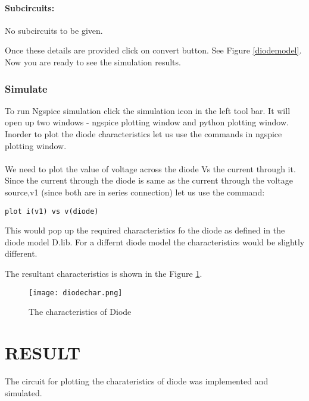 \paragraph{Subcircuits:} No subcircuits to be given.

\noindent Once these details are provided click on convert button. See Figure \ref{diodemodel}. Now you are ready to see the simulation results.

\subsubsection{Simulate} To run Ngspice simulation click the simulation icon in the left tool bar. It will open up two windows - ngspice plotting window and python plotting window. Inorder to plot the diode characteristics let us use the commands in ngspice plotting window. 

\paragraph{}We need to plot the value of voltage across the diode Vs the current through it. Since the current through the diode is same as the current through the voltage source,v1 (since both are in series connection) let us use the command:

\texttt{plot i(v1) vs v(diode)}

This would pop up the required characteristics fo the diode as defined in the diode model D.lib. For a differnt diode model the characteristics would be slightly different.

The resultant characteristics is shown in the Figure \ref{diodechara}.

\begin{figure}[h]
\centering
\texttt{[image: diodechar.png]}
\caption{The characteristics of Diode}
\label{diodechara}
\end{figure}

\section*{RESULT}
The circuit for plotting the charateristics of diode was implemented and simulated.


